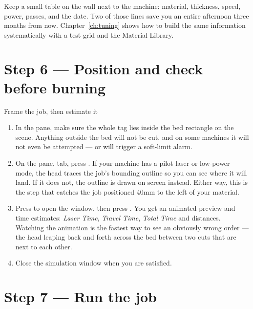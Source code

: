 \begin{tipbox}
Keep a small table on the wall next to the machine: material, thickness, speed,
power, passes, and the date. Two of those lines save you an entire afternoon
three months from now. Chapter~\ref{ch:tuning} shows how to build the same
information systematically with a test grid and the Material Library.
\end{tipbox}

\section{Step 6 --- Position and check before burning}

\begin{walkthrough}{Frame the job, then estimate it}
\begin{enumerate}[label=\arabic*.,leftmargin=1.4em]
  \item In the  pane, make sure the whole tag lies inside the bed
        rectangle on the scene. Anything outside the bed will not be cut, and on
        some machines it will not even be attempted --- or will trigger a
        soft-limit alarm.
  \item On the  pane,  tab, press
        . If your machine has a pilot laser or low-power mode, the
        head traces the job's bounding outline so you can see where it will land.
        If it does not, the outline is drawn on screen instead. Either way, this
        is the step that catches the job positioned 40\unit{mm} to the left of
        your material.
  \item Press  to open the  window, then press
        . You get an animated preview and time estimates:
        \emph{Laser Time}, \emph{Travel Time}, \emph{Total Time} and distances.
        Watching the animation is the fastest way to see an obviously wrong
        order --- the head leaping back and forth across the bed between two
        cuts that are next to each other.
  \item Close the simulation window when you are satisfied.
\end{enumerate}
\end{walkthrough}

\section{Step 7 --- Run the job}

